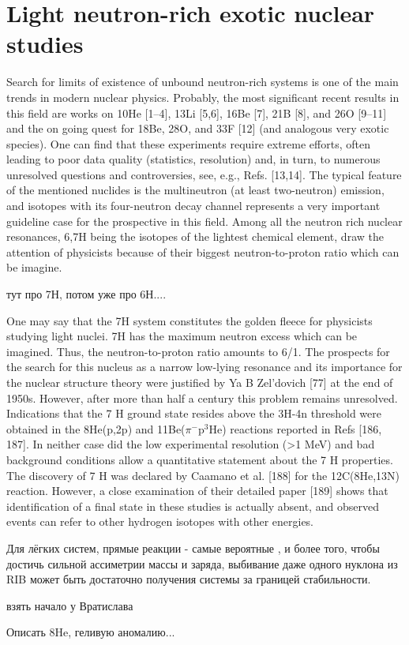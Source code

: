 \section{Light neutron-rich exotic nuclear studies}

Search for limits of existence of unbound neutron-rich systems is one of the main trends in modern nuclear physics.
Probably, the most significant recent results in this field are works on 10He [1–4], 13Li [5,6], 16Be [7], 21B [8], and 26O [9–11] and the on going quest for 18Be, 28O, and 33F [12] (and analogous very
exotic species). 
One can find that these experiments require extreme efforts, often leading to poor data quality (statistics, resolution) and, in turn, to numerous unresolved questions and controversies, see, e.g., Refs. [13,14].
The typical feature of the mentioned nuclides is the multineutron (at least two-neutron) emission, and  isotopes  with its four-neutron decay channel represents a very important guideline case for the prospective in this field.
Among all the neutron rich nuclear resonances, 6,7H being the isotopes of the lightest chemical element, draw the attention of physicists because of their biggest neutron-to-proton ratio which can be imagine.

тут про 7Н, потом уже про 6Н....

One may say that the 7H system constitutes the golden fleece for physicists studying light nuclei. 
7H has the maximum neutron excess which can be imagined. 
Thus, the neutron-to-proton ratio amounts to 6/1. The prospects for the search for this nucleus as a narrow low-lying resonance and its importance for the nuclear structure theory were justified by Ya B Zel'dovich [77] at the end of 1950s. 
However, after more than half a century this problem remains unresolved.
Indications that the 7 H ground state resides above the 3H-4n threshold were obtained in the 8He(p,2p) and 11Be($\pi^-$p$^3$He) reactions reported in Refs [186, 187]. 
In neither case did the low experimental resolution (>1 MeV) and bad background conditions allow a quantitative statement about the 7 H properties. 
The discovery of 7 H was declared by Caamano et al. [188] for the 12C(8He,13N) reaction. 
However, a close examination of their detailed paper [189] shows that identification of a final state in these studies is actually absent, and observed events can refer to other hydrogen isotopes with other energies.


Для лёгких систем, прямые реакции - самые вероятные , и более того, чтобы достичь сильной ассиметрии массы и заряда, выбивание даже одного нуклона из RIB может быть достаточно получения системы за границей стабильности.

взять начало у Вратислава

Описать 8He, геливую аномалию...